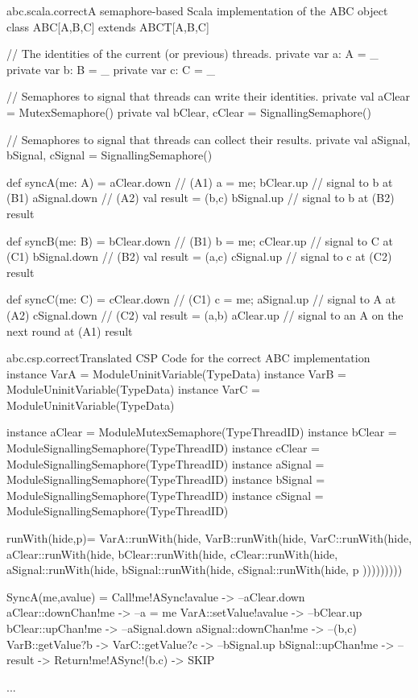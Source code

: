 \documentclass[a4paper, 12pt]{article}
\begin{document}
\begin{scalafloat}{abc.scala.correct}{A semaphore-based Scala implementation of the ABC object}
class ABC[A,B,C] extends ABCT[A,B,C]{
  // The identities of the current (or previous) threads.
  private var a: A = _
  private var b: B = _
  private var c: C = _

  // Semaphores to signal that threads can write their identities.
  private val aClear = MutexSemaphore()
  private val bClear, cClear = SignallingSemaphore()

  // Semaphores to signal that threads can collect their results. 
  private val aSignal, bSignal, cSignal = SignallingSemaphore()

  def syncA(me: A) = {
    aClear.down         // (A1)
    a = me; bClear.up   // signal to b at (B1)
    aSignal.down        // (A2)
    val result = (b,c)
    bSignal.up          // signal to b at (B2)
    result
  }

  def syncB(me: B) = {
    bClear.down         // (B1)
    b = me; cClear.up   // signal to C at (C1)
    bSignal.down        // (B2)
    val result = (a,c)
    cSignal.up          // signal to c at (C2)
    result
  }

  def syncC(me: C) = {
    cClear.down         // (C1)
    c = me; aSignal.up  // signal to A at (A2)
    cSignal.down        // (C2)
    val result = (a,b)
    aClear.up           // signal to an A on the next round at (A1)
    result
  }
}      
\end{scalafloat}

\begin{cspfloat}{abc.csp.correct}{Translated CSP Code for the correct ABC implementation}
instance VarA = ModuleUninitVariable(TypeData) 
instance VarB = ModuleUninitVariable(TypeData)
instance VarC = ModuleUninitVariable(TypeData)

instance aClear = ModuleMutexSemaphore(TypeThreadID)
instance bClear = ModuleSignallingSemaphore(TypeThreadID)
instance cClear = ModuleSignallingSemaphore(TypeThreadID)
instance aSignal = ModuleSignallingSemaphore(TypeThreadID)
instance bSignal = ModuleSignallingSemaphore(TypeThreadID)
instance cSignal = ModuleSignallingSemaphore(TypeThreadID)

runWith(hide,p)=
  VarA::runWith(hide,
  VarB::runWith(hide,
  VarC::runWith(hide,
  aClear::runWith(hide,
  bClear::runWith(hide,
  cClear::runWith(hide,
  aSignal::runWith(hide,
  bSignal::runWith(hide,
  cSignal::runWith(hide,
    p
  )))))))))

SyncA(me,avalue) =
  Call!me!ASync!avalue ->
  --aClear.down
  aClear::downChan!me ->
  --a = me
  VarA::setValue!avalue ->
  --bClear.up
  bClear::upChan!me ->
  --aSignal.down
  aSignal::downChan!me ->
  --(b,c)
  VarB::getValue?b ->
  VarC::getValue?c ->
  --bSignal.up
  bSignal::upChan!me ->
  --result ->
  Return!me!ASync!(b.c) ->
  SKIP

...
\end{cspfloat}
\end{document}
